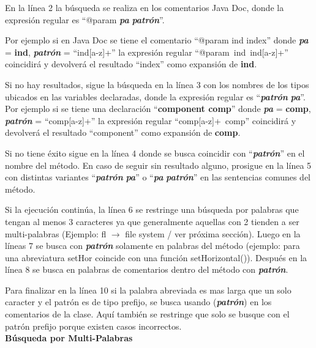 \documentclass[a4paper,12pt]{report}
\makeatletter
\newcommand{\at}{\makeatletter @\makeatother}%
\makeatother
\begin{document}
En la línea 2 la búsqueda se realiza en los comentarios Java Doc, donde la expresión regular es “\at param \textit{\textbf{pa}} \textit{\textbf{patrón}}”. 

Por ejemplo si en Java Doc se tiene el comentario “\at param ind index” donde \textit{\textbf{pa}} = \textbf{ind}, \textit{\textbf{patrón}} = “ind[a-z]+”  la expresión regular \mbox{“\at param ind ind[a-z]+”} coincidirá y devolverá el resultado  “index” como expansión de \textbf{ind}.

Si no hay resultados, sigue la búsqueda en la línea 3 con los nombres de los tipos ubicados en las variables declaradas, donde la expresión regular es “\textit{\textbf{patrón}} \textit{\textbf{pa}}”. Por ejemplo si se tiene una declaración “\textbf{component comp}” donde \textit{\textbf{pa}} = \textbf{comp}, \textit{\textbf{patrón}} = “comp[a-z]+”  la expresión regular \mbox{“comp[a-z]+ comp”} coincidirá y devolverá el resultado  “component” como expansión de \textbf{comp}.

Si no tiene éxito sigue en la línea 4 donde se busca coincidir con “\textit{\textbf{patrón}}” en el nombre del método. En caso de seguir sin resultado alguno, prosigue en la línea 5 con distintas variantes “\textit{\textbf{patrón}} \textit{\textbf{pa}}” o “\textit{\textbf{pa}} \textit{\textbf{patrón}}” en las sentencias comunes del método. 


Si la ejecución continúa, la línea 6 se restringe una búsqueda por palabras que tengan al menos 3 caracteres ya que generalmente aquellas con 2 tienden a ser multi-palabras (Ejemplo: \textsf{fl $\rightarrow$ file system} / ver próxima sección). Luego en la líneas 7 se busca con \textit{\textbf{patrón}} solamente en palabras del método (ejemplo: para una abreviatura \textsf{setHor} coincide con una función \textsf{setHorizontal()}). Después en la línea 8 se busca en palabras de comentarios dentro del método con \textit{\textbf{patrón}}.


Para finalizar en la línea 10 si la palabra abreviada es mas larga que un solo caracter y el patrón es de tipo prefijo, se busca usando (\textit{\textbf{patrón}}) en los comentarios de la clase. Aquí también se restringe que solo se busque con el patrón prefijo porque existen casos incorrectos\cite{EZH08}.\\

\noindent \textbf{Búsqueda por Multi-Palabras\\}
\end{document}
